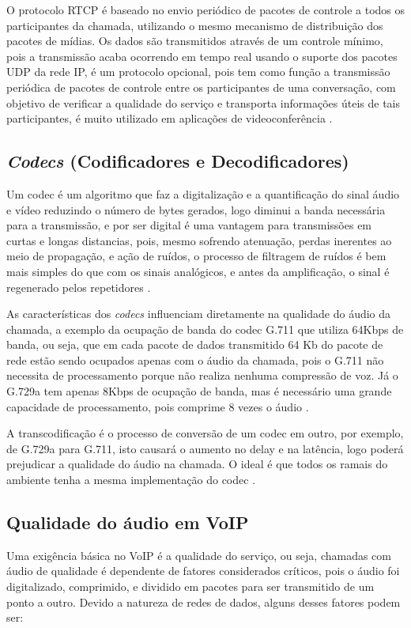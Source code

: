 O protocolo RTCP é baseado no envio periódico de pacotes de controle a todos os participantes da chamada, utilizando o mesmo mecanismo de distribuição dos pacotes de mídias. Os dados são transmitidos através de um controle mínimo, pois a transmissão acaba ocorrendo em tempo real usando o suporte dos pacotes UDP da rede IP, é um protocolo opcional, pois tem como função a transmissão periódica de pacotes de controle entre os participantes de uma conversação, com objetivo de verificar a qualidade do serviço e transporta informações úteis de tais participantes, é muito utilizado em aplicações de videoconferência \cite{henningcasnervan1996}.

\subsection{\textit{Codecs} (Codificadores e Decodificadores)}
Um codec é um algoritmo que faz a digitalização e a quantificação do sinal áudio e vídeo reduzindo o número de bytes gerados, logo diminui a banda necessária para a transmissão, e por ser digital é uma vantagem para transmissões em curtas e longas distancias, pois, mesmo sofrendo atenuação, perdas inerentes ao meio de propagação, e ação de ruídos, o processo de filtragem de ruídos é bem mais simples do que com os sinais analógicos, e antes da amplificação, o sinal é regenerado pelos repetidores \cite{eduardomaronasmonks2006}.

As características dos \textit{codecs} influenciam diretamente na qualidade do áudio da chamada, a exemplo da ocupação de banda do codec G.711 que utiliza 64Kbps de banda, ou seja, que em cada pacote de dados transmitido 64 Kb do pacote de rede estão sendo ocupados apenas com o áudio da chamada, pois o G.711 não necessita de processamento porque não realiza nenhuma compressão de voz. Já o G.729a tem apenas 8Kbps de ocupação de banda, mas é necessário uma grande capacidade de processamento, pois comprime 8 vezes o áudio \cite{alexandrekeller2014}.

A transcodificação é o processo de conversão de um codec em outro, por exemplo, de G.729a para G.711, isto causará o aumento no delay e na latência, logo poderá prejudicar a qualidade do áudio na chamada. O ideal é que todos os ramais do ambiente tenha a mesma implementação do codec \cite{alexandrekeller2014}.

\subsection{Qualidade do áudio em VoIP}
Uma exigência básica no VoIP é a qualidade do serviço, ou seja, chamadas com áudio de qualidade é dependente de fatores considerados críticos, pois o áudio foi digitalizado, comprimido, e dividido em pacotes para ser transmitido de um ponto a outro. Devido a natureza de redes de dados, alguns desses fatores podem ser: \cite{davidson2008}

